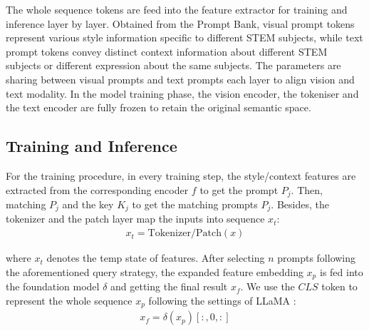 The whole sequence tokens are feed into the feature extractor for training and inference layer by layer. Obtained from the Prompt Bank, visual prompt tokens represent various style information specific to different STEM subjects, while text prompt tokens convey distinct context information about different STEM subjects or different expression about the same subjects. 
The parameters are sharing between visual prompts and text prompts each layer to align vision and text modality. 
In the model training phase, the vision encoder, the tokeniser and the text encoder are fully frozen to retain the original semantic space.

\subsection{Training and Inference}
\label{subsec:training_inference}



For the training procedure, in every training step, the style/context features are extracted from the corresponding encoder $f$ to get the prompt $P_j$. Then, matching $P_j$ and the key $K_j$ to get the matching prompts $P_j$. Besides, the tokenizer and the patch layer map the inputs into sequence $x_t$: 
{\setlength{\abovedisplayskip}{6pt}
\setlength{\belowdisplayskip}{6pt}
\begin{eqnarray}
x_t = \mathrm{Tokenizer/Patch}(x)
\end{eqnarray}}

\noindent where $x_t$ denotes the temp state of features. 
After selecting $n$ prompts following the aforementioned query strategy, the expanded feature embedding $x_p$ is fed into the foundation model $\delta$ and getting the final result $x_f$. We use the $CLS$ token to represent the whole sequence $x_p$ following the settings of LLaMA \cite{touvron2023llama}:
{\setlength{\abovedisplayskip}{6pt}
\setlength{\belowdisplayskip}{6pt}
\begin{eqnarray}
x_f = \delta(x_p)[:, 0, :]
\end{eqnarray}}

